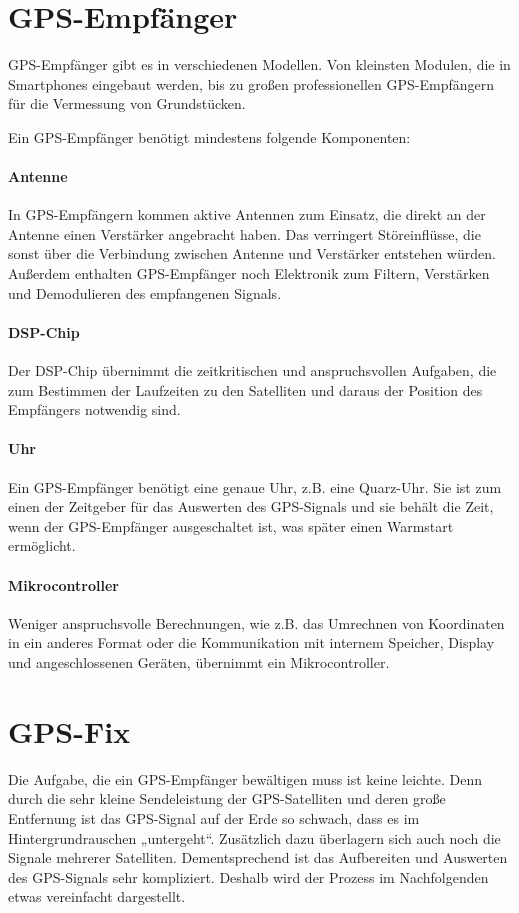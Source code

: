 \documentclass[12pt,a4paper]{scrartcl}
\begin{document}
\section{GPS-Empfänger}
GPS-Empfänger gibt es in verschiedenen Modellen. Von kleinsten Modulen, die in Smartphones eingebaut werden, bis zu großen professionellen GPS-Empfängern für die Vermessung von Grundstücken.

Ein GPS-Empfänger benötigt mindestens folgende Komponenten:

\paragraph{Antenne}
In GPS-Empfängern kommen aktive Antennen zum Einsatz, die direkt an der Antenne einen Verstärker angebracht haben. Das verringert Störeinflüsse, die sonst über die Verbindung zwischen Antenne und Verstärker entstehen würden. Außerdem enthalten GPS-Empfänger noch Elektronik zum Filtern, Verstärken und Demodulieren des empfangenen Signals.

\paragraph{DSP-Chip}
Der DSP-Chip übernimmt die zeitkritischen und anspruchsvollen Aufgaben, die zum Bestimmen der Laufzeiten zu den Satelliten und daraus der Position des Empfängers notwendig sind.

\paragraph{Uhr}
Ein GPS-Empfänger benötigt eine genaue Uhr, z.B. eine Quarz-Uhr. Sie ist zum einen der Zeitgeber für das Auswerten des GPS-Signals und sie behält die Zeit, wenn der GPS-Empfänger ausgeschaltet ist, was später einen Warmstart ermöglicht.

\paragraph{Mikrocontroller}
Weniger anspruchsvolle Berechnungen, wie z.B. das Umrechnen von Koordinaten in ein anderes Format oder die Kommunikation mit internem Speicher, Display und angeschlossenen Geräten, übernimmt ein Mikrocontroller.

\section{GPS-Fix}
Die Aufgabe, die ein GPS-Empfänger bewältigen muss ist keine leichte.
Denn durch die sehr kleine Sendeleistung der GPS-Satelliten und deren große Entfernung ist das GPS-Signal auf der Erde so schwach, dass es im Hintergrundrauschen „untergeht“. Zusätzlich dazu überlagern sich auch noch die Signale mehrerer Satelliten. Dementsprechend ist das Aufbereiten und Auswerten des GPS-Signals sehr kompliziert. Deshalb wird der Prozess im Nachfolgenden etwas vereinfacht dargestellt.
\end{document}
